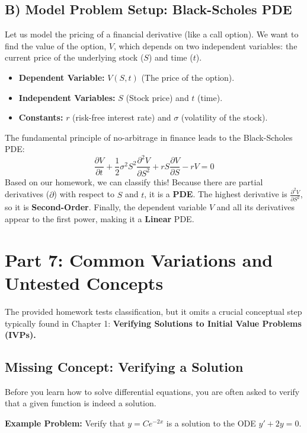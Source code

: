 \documentclass[11pt]{article}
\begin{document}
\subsection{B) Model Problem Setup: Black-Scholes PDE}
Let us model the pricing of a financial derivative (like a call option). We want to find the value of the option, $V$, which depends on two independent variables: the current price of the underlying stock ($S$) and time ($t$). 
\begin{itemize}
    \item \textbf{Dependent Variable:} $V(S, t)$ (The price of the option).
    \item \textbf{Independent Variables:} $S$ (Stock price) and $t$ (time).
    \item \textbf{Constants:} $r$ (risk-free interest rate) and $\sigma$ (volatility of the stock).
\end{itemize}
The fundamental principle of no-arbitrage in finance leads to the Black-Scholes PDE:
\[ \frac{\partial V}{\partial t} + \frac{1}{2}\sigma^2 S^2 \frac{\partial^2 V}{\partial S^2} + rS\frac{\partial V}{\partial S} - rV = 0 \]
Based on our homework, we can classify this! Because there are partial derivatives ($\partial$) with respect to $S$ and $t$, it is a \textbf{PDE}. The highest derivative is $\frac{\partial^2 V}{\partial S^2}$, so it is \textbf{Second-Order}. Finally, the dependent variable $V$ and all its derivatives appear to the first power, making it a \textbf{Linear} PDE.

\section{Part 7: Common Variations and Untested Concepts}

The provided homework tests classification, but it omits a crucial conceptual step typically found in Chapter 1: \textbf{Verifying Solutions to Initial Value Problems (IVPs).}

\subsection*{Missing Concept: Verifying a Solution}
Before you learn how to solve differential equations, you are often asked to verify that a given function is indeed a solution. 

\textbf{Example Problem:} Verify that $y = C e^{-2x}$ is a solution to the ODE $y' + 2y = 0$.
\vspace{0.2cm}
\end{document}
